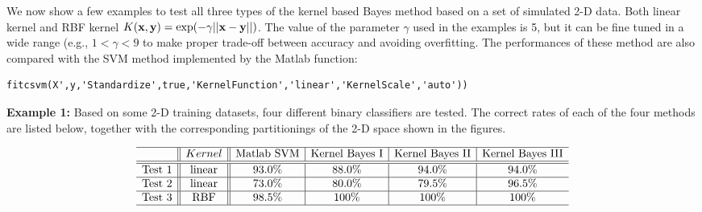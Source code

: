 \documentclass{article}
\begin{document}
We now show a few examples to test all three types of the kernel based 
Bayes method based on a set of simulated 2-D data. Both linear kernel
and RBF kernel $K({\bf x},{\bf y})=\exp(-\gamma||{\bf x}-{\bf y}||)$.
The value of the parameter $\gamma$ used in the examples is 5, but it 
can be fine tuned in a wide range (e.g., $1<\gamma<9$ to make proper
trade-off between accuracy and avoiding overfitting. The performances 
of these method are also compared with the SVM method implemented by 
the Matlab function: 
\begin{verbatim}
fitcsvm(X',y,'Standardize',true,'KernelFunction','linear','KernelScale','auto'))
\end{verbatim}

{\bf Example 1:} Based on some 2-D training datasets, four different 
binary classifiers are tested. The correct rates of each of the four
methods are listed below, together with the corresponding partitionings
of the 2-D space shown in the figures.

\begin{equation}
\begin{array}{l||c||c|c|c|c} \hline
& Kernel & \mbox{Matlab SVM} & \mbox{Kernel Bayes I} & \mbox{Kernel Bayes II} & \mbox{Kernel Bayes III}\\ \hline\hline
\mbox{Test 1} & \mbox{linear} & 93.0\% & 88.0\% & 94.0\% & 94.0\%\\\hline
\mbox{Test 2} & \mbox{linear} & 73.0\% & 80.0\% & 79.5\% & 96.5\%\\\hline
\mbox{Test 3} & \mbox{RBF}    & 98.5\% & 100\% & 100\% & 100\%\\\hline
\end{array}
\end{equation}
\end{document}
